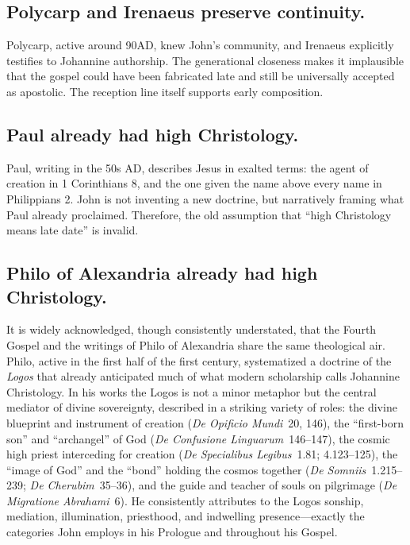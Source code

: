 \subsection{Polycarp and Irenaeus preserve continuity.}\label{subsec:polycarp-and-irenaeus-preserve-continuity.}

Polycarp, active around 90AD, knew John’s community, and Irenaeus explicitly testifies to Johannine authorship.
The generational closeness makes it implausible that the gospel could have been fabricated late and still be universally accepted as apostolic.
The reception line itself supports early composition.

\subsection{Paul already had high Christology.}\label{subsec:paul-already-had-high-christology.}

Paul, writing in the 50s AD, describes Jesus in exalted terms: the agent of creation in 1 Corinthians 8, and the one given the name above every name in Philippians 2.
John is not inventing a new doctrine, but narratively framing what Paul already proclaimed.
Therefore, the old assumption that “high Christology means late date” is invalid.

\subsection{Philo of Alexandria already had high Christology.}\label{subsec:philo-of-alexandria-already-had-high-christology.}

It is widely acknowledged, though consistently understated, that the Fourth Gospel and the writings of Philo of Alexandria share the same theological air.
Philo, active in the first half of the first century, systematized a doctrine of the \emph{Logos} that already anticipated much of what modern scholarship calls Johannine Christology.
In his works the Logos is not a minor metaphor but the central mediator of divine sovereignty, described in a striking variety of roles:
the divine blueprint and instrument of creation (\emph{De Opificio Mundi}~20, 146),
the “first-born son” and “archangel” of God (\emph{De Confusione Linguarum}~146–147),
the cosmic high priest interceding for creation (\emph{De Specialibus Legibus}~1.81; 4.123–125),
the “image of God” and the “bond” holding the cosmos together (\emph{De Somniis}~1.215–239; \emph{De Cherubim}~35–36),
and the guide and teacher of souls on pilgrimage (\emph{De Migratione Abrahami}~6).
He consistently attributes to the Logos sonship, mediation, illumination, priesthood, and indwelling presence—exactly the categories John employs in his Prologue and throughout his Gospel.

